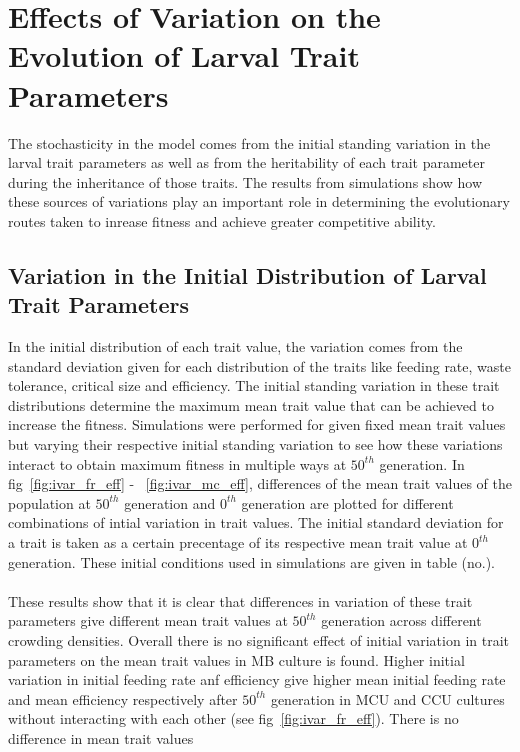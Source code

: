 \chapter{Effects of Variation on the Evolution of Larval Trait Parameters}
The stochasticity in the model comes from the initial standing variation in the larval trait parameters as well as from the heritability of each trait parameter during the inheritance of those traits. The results from simulations show how these sources of variations play an important role in determining the evolutionary routes taken to inrease fitness and achieve greater competitive ability.
\section{Variation in the Initial Distribution of Larval Trait Parameters}
In the initial distribution of each trait value, the variation comes from the standard deviation given for each distribution of the traits like feeding rate, waste tolerance, critical size and efficiency. The initial standing variation in these trait distributions determine the maximum mean trait value that can be achieved to increase the fitness. Simulations were performed for given fixed mean trait values but varying their respective initial standing variation to see how these variations interact to obtain maximum fitness in multiple ways at $50^{th}$ generation. In fig~\ref{fig:ivar_fr_eff} - ~\ref{fig:ivar_mc_eff}, differences of the mean trait values of the population at $50^{th}$ generation and $0^{th}$ generation are plotted for different combinations of intial variation in trait values. The initial standard deviation for a trait is taken as a certain precentage of its respective mean trait value at $0^{th}$ generation. These initial conditions used in simulations are given in table (no.).\\\\
These results show that it is clear that differences in variation of these trait parameters give different mean trait values at $50^{th}$ generation across different crowding densities. Overall there is no significant effect of initial variation in trait parameters on the mean trait values in MB culture is found. Higher initial variation in initial feeding rate anf efficiency give higher mean initial feeding rate and mean efficiency respectively after $50^{th}$ generation in MCU and CCU cultures without interacting with each other (see fig~\ref{fig:ivar_fr_eff}). There is no difference in mean trait values
